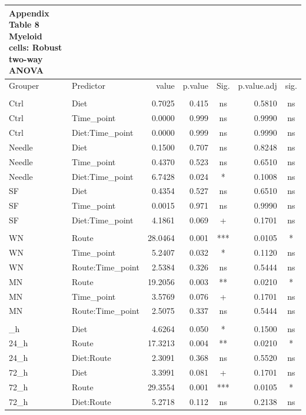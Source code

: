 \documentclass[
  12pt,
  letterpaper,
]{article}
\begin{document}
\begingroup
\fontsize{12.0pt}{14.4pt}\selectfont
\begin{longtable}{l|lrrcrc}
\caption*{
{\large \textbf{Appendix Table 8}} \\ 
{\small \textbf{Myeloid cells: Robust two-way ANOVA}}
} \\ 
\toprule
Grouper & {Predictor} & {value} & {p.value} & {Sig.} & {p.value.adj} & {sig.} \\ 
\midrule\addlinespace[2.5pt]
\multicolumn{7}{l}{Grouped by Route} \\[2.5pt] 
\midrule\addlinespace[2.5pt]
Ctrl & Diet & 0.7025 & 0.415 & ns & 0.5810 & ns \\ 
Ctrl & Time\_point & 0.0000 & 0.999 & ns & 0.9990 & ns \\ 
Ctrl & Diet:Time\_point & 0.0000 & 0.999 & ns & 0.9990 & ns \\ 
Needle & Diet & 0.1500 & 0.707 & ns & 0.8248 & ns \\ 
Needle & Time\_point & 0.4370 & 0.523 & ns & 0.6510 & ns \\ 
Needle & Diet:Time\_point & 6.7428 & 0.024 & * & 0.1008 & ns \\ 
SF & Diet & 0.4354 & 0.527 & ns & 0.6510 & ns \\ 
SF & Time\_point & 0.0015 & 0.971 & ns & 0.9990 & ns \\ 
SF & Diet:Time\_point & 4.1861 & 0.069 & + & 0.1701 & ns \\ 
\midrule\addlinespace[2.5pt]
\multicolumn{7}{l}{Grouped by Diet} \\[2.5pt] 
\midrule\addlinespace[2.5pt]
WN & Route & 28.0464 & 0.001 & *** & 0.0105 & * \\ 
WN & Time\_point & 5.2407 & 0.032 & * & 0.1120 & ns \\ 
WN & Route:Time\_point & 2.5384 & 0.326 & ns & 0.5444 & ns \\ 
MN & Route & 19.2056 & 0.003 & ** & 0.0210 & * \\ 
MN & Time\_point & 3.5769 & 0.076 & + & 0.1701 & ns \\ 
MN & Route:Time\_point & 2.5075 & 0.337 & ns & 0.5444 & ns \\ 
\midrule\addlinespace[2.5pt]
\multicolumn{7}{l}{Grouped by Time\_point} \\[2.5pt] 
\midrule\addlinespace[2.5pt]
24\_h & Diet & 4.6264 & 0.050 & * & 0.1500 & ns \\ 
24\_h & Route & 17.3213 & 0.004 & ** & 0.0210 & * \\ 
24\_h & Diet:Route & 2.3091 & 0.368 & ns & 0.5520 & ns \\ 
72\_h & Diet & 3.3991 & 0.081 & + & 0.1701 & ns \\ 
72\_h & Route & 29.3554 & 0.001 & *** & 0.0105 & * \\ 
72\_h & Diet:Route & 5.2718 & 0.112 & ns & 0.2138 & ns \\ 
\bottomrule
\end{longtable}
\endgroup
\end{document}
